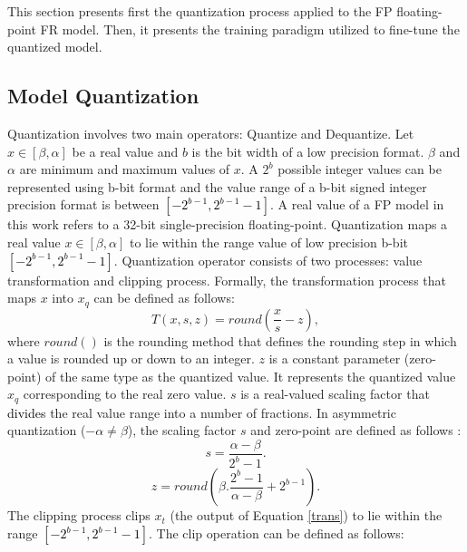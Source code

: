 \documentclass[a4paper,conference]{IEEEtran}
\begin{document}
This section presents first the quantization process applied to the FP floating-point FR model. Then, it presents the training paradigm utilized to fine-tune the quantized model.

\vspace{-1mm}
\subsection{Model Quantization}
\vspace{-1mm}
Quantization involves two main operators: Quantize and Dequantize.   
Let $x \in [\beta,\alpha]$ be a real value and $b$ is the bit width of a low precision format.  
$\beta$ and $\alpha$ are minimum and maximum values of $x$.
A $2^b$ possible integer values can be represented using  b-bit format and the value range of a b-bit signed integer precision format is between \textcolor{black}{ $[-2^{b-1},2^{b-1}-1]$}. 
A real value of a FP model in this work refers to a 32-bit single-precision floating-point.
Quantization maps a real value $x \in [\beta,\alpha]$ to lie within the range value of low precision b-bit \textcolor{black}{$[-2^{b-1},2^{b-1}-1]$}. 
Quantization operator consists of two processes: value transformation and clipping process. Formally, the transformation process that maps $x$ into $x_q$ can be defined as follows:
\vspace{-1mm}
\begin{equation}
\label{trans}
    T(x, s, z) = round(\frac{x}{s} - z),
\end{equation}
where $round()$ is the rounding method that defines the rounding step in which a value is rounded up or down to an integer. $z$ is a constant parameter (zero-point) of the same type as the quantized value. 
It represents the quantized value $x_q$ corresponding to the real zero value. 
$s$ is a real-valued scaling factor that \textcolor{black}{divides} the real value range into a number of fractions. 
In asymmetric quantization ($-\alpha \neq \beta$), the scaling factor $s$ and zero-point are defined as follows \cite{DBLP:conf/cvpr/JacobKCZTHAK18}:
\vspace{-1mm}
\begin{equation}
    s= \frac{\alpha-\beta}{2^b-1}.
\end{equation}
\vspace{-1mm}
\begin{equation}
    z=round (\beta . \frac{2^b-1}{\alpha-\beta} + 2^{b-1}).
\end{equation}
The clipping process clips $x_t$ (the output of Equation \ref{trans}) to lie within the range \textcolor{black}{$[-2^{b-1},2^{b-1}-1]$}. The clip operation can be defined as follows:
\end{document}
